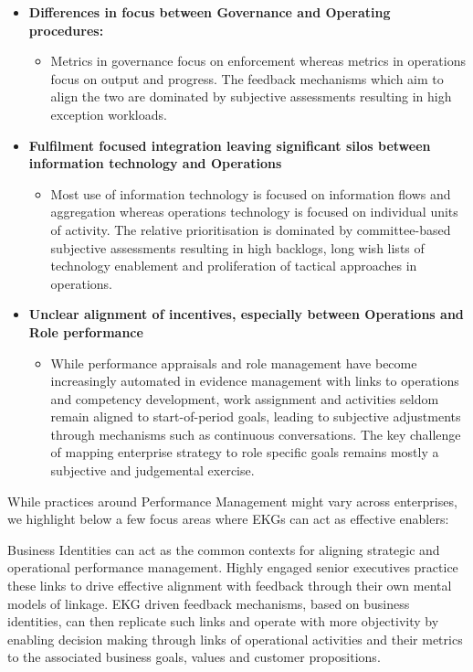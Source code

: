 \begin{itemize}
    \item \textbf{Differences in focus between Governance and Operating procedures:}
    \begin{itemize}
        \item Metrics in governance focus on enforcement whereas metrics in operations focus on output and progress.
        The feedback mechanisms which aim to align the two are dominated by subjective assessments resulting in
        high exception workloads.
    \end{itemize}
    \item \textbf{Fulfilment focused integration leaving significant silos between information technology and
        Operations}
    \begin{itemize}
        \item Most use of information technology is focused on information flows and aggregation whereas operations
        technology is focused on individual units of activity. The relative prioritisation is dominated by
        committee-based subjective assessments resulting in high backlogs,
        long wish lists of technology enablement and proliferation of tactical approaches in operations.
    \end{itemize}
    \item \textbf{Unclear alignment of incentives, especially between Operations and Role performance}
    \begin{itemize}
        \item While performance appraisals and role management have become increasingly automated in evidence
        management with links to operations and competency development, work assignment and activities seldom
        remain aligned to start-of-period goals, leading to subjective adjustments through mechanisms such as
        continuous conversations.
        The key challenge of mapping enterprise strategy to role specific goals remains mostly a
        subjective and judgemental exercise.
    \end{itemize}
\end{itemize}

\ekgmmContextSection

While practices around Performance Management might vary across enterprises,
we highlight below a few focus areas where EKGs can act as effective enablers:

Business Identities can act as the common contexts for aligning strategic and operational performance management.
Highly engaged senior executives practice these links to drive effective alignment with feedback through their
own mental models of linkage.
EKG driven feedback mechanisms, based on business identities, can then replicate such links and operate with
more objectivity by enabling decision making through links of operational activities and their metrics to the
associated business goals, values and customer propositions.


